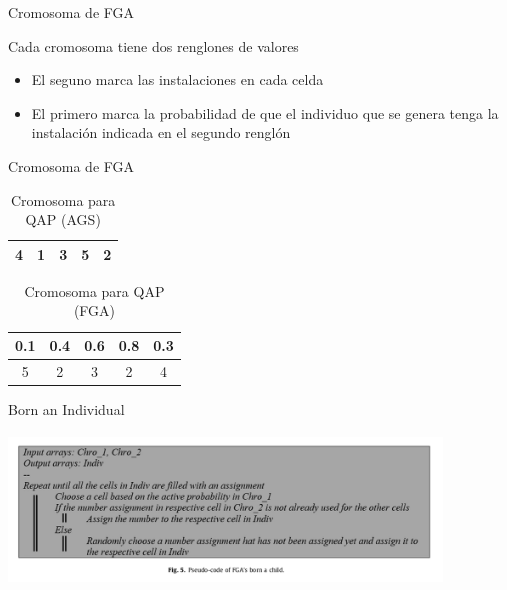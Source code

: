 \documentclass[10pt]{beamer}
\begin{document}
\begin{frame}{Cromosoma de FGA}

	Cada cromosoma tiene dos renglones de valores
	
	\begin{itemize}
	
		\item El seguno marca las instalaciones en cada celda
		
		\item  El primero marca la probabilidad de que el individuo que se genera
		 tenga la instalación indicada en el segundo renglón
	
	\end{itemize}
	

\end{frame}

\begin{frame}{Cromosoma de FGA}


	\begin{table}
 		\caption{Cromosoma para QAP (AGS)}
 		\begin{tabular}[t]{|c|c|c|c|c|}
			\hline
			4 & 1 & 3 & 5 & 2\\
			\hline
		\end{tabular}
 	\end{table}


	\begin{table}
 		\caption{Cromosoma para QAP (FGA)}
 		\begin{tabular}[t]{|c|c|c|c|c|}
			\hline
			0.1 & 0.4 & 0.6 & 0.8 & 0.3 \\
			\hline
			5 & 2 & 3 & 2 & 4\\
			\hline
		\end{tabular}
 	\end{table}


\end{frame}

\begin{frame}{Born an Individual}


\includegraphics[width=11.5cm, height=4cm]{code}


\end{frame}
\end{document}
